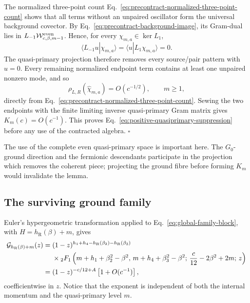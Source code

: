 \documentclass[11pt]{article}
\newcommand{\R}{\mathrm R}
\begin{document}
The normalized three-point count
Eq.~\eqref{eq:precontract-normalized-three-point-count} shows that all
terms without an unpaired oscillator form the universal background
covector.  By Eq.~\eqref{eq:precontract-background-image}, its Gram-dual
lies in \(L_{-1}\mathcal W_{c,\beta,m-1}^{\rm even}\).  Hence, for every
\(\chi_{m,a}\in\ker L_1\),
\[
 \langle L_{-1}u|\chi_{m,a}\rangle
 =\langle u|L_1\chi_{m,a}\rangle=0.
\]
The quasi-primary projection therefore removes every source/pair pattern
with \(u=0\).  Every remaining normalized endpoint term contains at least
one unpaired nonzero mode, and so
\begin{equation}
 \rho_{L,R}\!\left(\widehat\chi_{m,a}\right)
 =O(c^{-1/2}),
 \qquad m\ge1,
 \label{eq:unit-quasiprimary-coupling}
\end{equation}
directly from Eq.~\eqref{eq:precontract-normalized-three-point-count}.
Sewing the two endpoints with the finite limiting inverse quasi-primary
Gram matrix gives \(K_m(c)=O(c^{-1})\).  This proves
Eq.~\eqref{eq:positive-quasiprimary-suppression} before any use of the
contracted algebra. \(\square\)

The use of the complete even quasi-primary space is important here.
The \(G_0\)-ground direction and the fermionic descendants participate
in the projection which removes the coherent piece; projecting the
ground fibre before forming \(K_m\) would invalidate the lemma.

\subsection{The surviving ground family}

Euler's hypergeometric transformation applied to
Eq.~\eqref{eq:global-family-block}, with
\(H=h_\R(\beta)+m\), gives
\begin{align}
 \mathcal G_{h_\R(\beta)+m}(z)
 ={}&
 (1-z)^{h_1+h_4-h_\R(\beta_2)-h_\R(\beta_3)}
 \notag\\
 &\times
 {}_2F_1\left(
 m+h_1+\beta_2^2-\beta^2,\,
 m+h_4+\beta_3^2-\beta^2;\,
 \frac c{12}-2\beta^2+2m;\,z\right)
 \notag\\
 ={}&
 (1-z)^{-c/12+A}\left[1+O(c^{-1})\right],
 \label{eq:global-family-large-c}
\end{align}
coefficientwise in \(z\).  Notice that the exponent is independent of
both the internal momentum and the quasi-primary level \(m\).
\end{document}
